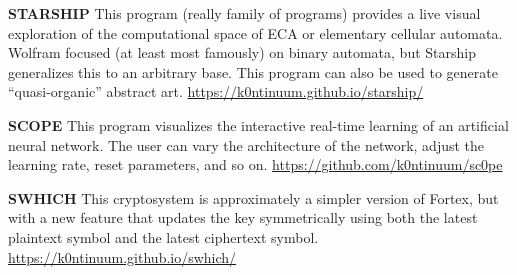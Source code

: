 \documentclass{article}
\renewcommand{\b}{\textbf}
\newcommand{\q}{\enquote}
\begin{document}
{{\b{STARSHIP} \quad This program (really family of programs) provides a live visual exploration of the computational space of ECA or elementary cellular automata. Wolfram focused (at least most famously) on binary automata, but Starship generalizes this to an arbitrary base. This program can also be used to generate \q{quasi-organic} abstract art. \quad \url{https://k0ntinuum.github.io/starship/}

\b{SCOPE} \quad This program visualizes the interactive real-time learning of an artificial neural network. The user can vary the architecture of the network, adjust the learning rate, reset parameters, and so on. \url{https://github.com/k0ntinuum/sc0pe} 

\b{SWHICH} \quad This cryptosystem is approximately a simpler version of Fortex, but with a new feature that updates the key symmetrically using both the latest plaintext symbol and the latest ciphertext symbol.
\url{https://k0ntinuum.github.io/swhich/} 





}}
\end{document}

